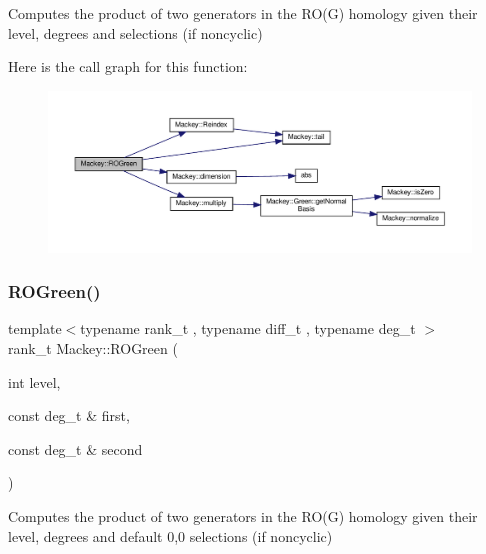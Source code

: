 Computes the product of two generators in the R\+O(\+G) homology given their level, degrees and selections (if noncyclic) 

Here is the call graph for this function\+:\nopagebreak
\begin{figure}[H]
\begin{center}
\leavevmode
\includegraphics[width=350pt]{namespaceMackey_a2bd86833844ca62d76c47a54aeb0bb77_cgraph}
\end{center}
\end{figure}
\mbox{\label{namespaceMackey_a07d3b1e748c6cf2fd8a6e21b948a0afe}} 
\subsubsection{\texorpdfstring{R\+O\+Green()}{ROGreen()}\hspace{0.1cm}{\footnotesize\ttfamily [2/2]}}
{\footnotesize\ttfamily template$<$typename rank\+\_\+t , typename diff\+\_\+t , typename deg\+\_\+t $>$ \\
rank\+\_\+t Mackey\+::\+R\+O\+Green (\begin{DoxyParamCaption}\item[{int}]{level,  }\item[{const deg\+\_\+t \&}]{first,  }\item[{const deg\+\_\+t \&}]{second }\end{DoxyParamCaption})\hspace{0.3cm}{\ttfamily [inline]}}



Computes the product of two generators in the R\+O(\+G) homology given their level, degrees and default 0,0 selections (if noncyclic) 

\mbox{\label{namespaceMackey_a58708ee937b0c4172b7cde8e5f856504}} 
